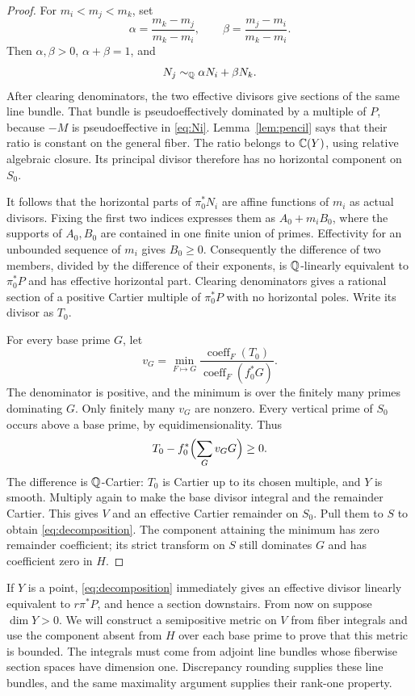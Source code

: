 \begin{proof}
For $m_i<m_j<m_k$, set
\[
\alpha=\frac{m_k-m_j}{m_k-m_i},\qquad
\beta=\frac{m_j-m_i}{m_k-m_i}.
\]
Then $\alpha,\beta>0$, $\alpha+\beta=1$, and
\[
N_j\sim_{\mathbb Q}\alpha N_i+\beta N_k.
\]
After clearing denominators, the two effective divisors give sections of the same line bundle. That bundle is pseudoeffectively dominated by a multiple of $P$, because $-M$ is pseudoeffective in \eqref{eq:Ni}. Lemma~\ref{lem:pencil} says that their ratio is constant on the general fiber. The ratio belongs to $\mathbb C(Y)$, using relative algebraic closure. Its principal divisor therefore has no horizontal component on $S_0$.

It follows that the horizontal parts of $\pi_0^*N_i$ are affine functions of $m_i$ as actual divisors. Fixing the first two indices expresses them as $A_0+m_iB_0$, where the supports of $A_0,B_0$ are contained in one finite union of primes. Effectivity for an unbounded sequence of $m_i$ gives $B_0\ge0$. Consequently the difference of two members, divided by the difference of their exponents, is $\mathbb Q$-linearly equivalent to $\pi_0^*P$ and has effective horizontal part. Clearing denominators gives a rational section of a positive Cartier multiple of $\pi_0^*P$ with no horizontal poles. Write its divisor as $T_0$.

For every base prime $G$, let
\[
v_G=\min_{F\mapsto G}
\frac{\operatorname{coeff}_F(T_0)}{\operatorname{coeff}_F(f_0^*G)}.
\]
The denominator is positive, and the minimum is over the finitely many primes dominating $G$. Only finitely many $v_G$ are nonzero. Every vertical prime of $S_0$ occurs above a base prime, by equidimensionality. Thus
\[
T_0-f_0^*\Bigl(\sum_Gv_GG\Bigr)\ge0.
\]
The difference is $\mathbb Q$-Cartier: $T_0$ is Cartier up to its chosen multiple, and $Y$ is smooth. Multiply again to make the base divisor integral and the remainder Cartier. This gives $V$ and an effective Cartier remainder on $S_0$. Pull them to $S$ to obtain \eqref{eq:decomposition}. The component attaining the minimum has zero remainder coefficient; its strict transform on $S$ still dominates $G$ and has coefficient zero in $H$.
\end{proof}

If $Y$ is a point, \eqref{eq:decomposition} immediately gives an effective divisor linearly equivalent to $r\pi^*P$, and hence a section downstairs. From now on suppose $\dim Y>0$. We will construct a semipositive metric on $V$ from fiber integrals and use the component absent from $H$ over each base prime to prove that this metric is bounded. The integrals must come from adjoint line bundles whose fiberwise section spaces have dimension one. Discrepancy rounding supplies these line bundles, and the same maximality argument supplies their rank-one property.

